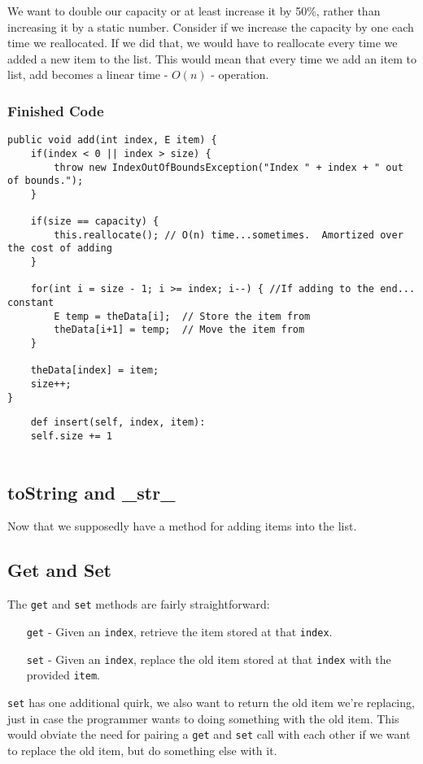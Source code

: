 We want to double our capacity or at least increase it by 50\%, rather than increasing it by a static number.
Consider if we increase the capacity by one each time we reallocated.  
If we did that, we would have to reallocate every time we added a new item to the list.  
This would mean that every time we add an item to list, add becomes a linear time - $O(n)$ - operation.





\subsubsection{Finished Code}
\begin{verbatim}
public void add(int index, E item) {
	if(index < 0 || index > size) {
		throw new IndexOutOfBoundsException("Index " + index + " out of bounds.");
	}
	
	if(size == capacity) {  
		this.reallocate(); // O(n) time...sometimes.  Amortized over the cost of adding
	}
	
	for(int i = size - 1; i >= index; i--) { //If adding to the end... constant
		E temp = theData[i];  // Store the item from 
		theData[i+1] = temp;  // Move the item from 
	}
	
	theData[index] = item;
	size++;
}
\end{verbatim}


\begin{verbatim}
	def insert(self, index, item):
	self.size += 1
	
\end{verbatim}


\subsection{toString and \_str\_}
Now that we supposedly have a method for adding items into the list.


\subsection{Get and Set}
The \texttt{get} and \texttt{set} methods are fairly straightforward:
\begin{enumerate}
\item[\texttt{get} -] Given an \texttt{index}, retrieve the item stored at that \texttt{index}.
\item[\texttt{set} -] Given an \texttt{index}, replace the old item stored at that \texttt{index} with the provided \texttt{item}.
\end{enumerate}
\texttt{set} has one additional quirk, we also want to return the old item we're replacing, just in case the programmer wants to doing something with the old item.
This would obviate the need for pairing a \texttt{get} and \texttt{set} call with each other if we want to replace the old item, but do something else with it. 

